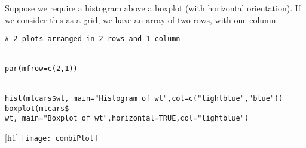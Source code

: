 Suppose we require a histogram above a boxplot (with horizontal orientation). If we consider this as a grid, we have an array of two rows, with one column.

\begin{framed}
\begin{verbatim}
# 2 plots arranged in 2 rows and 1 column


par(mfrow=c(2,1))


hist(mtcars$wt, main="Histogram of wt",col=c("lightblue","blue"))
boxplot(mtcars$
wt, main="Boxplot of wt",horizontal=TRUE,col="lightblue")

\end{verbatim}
\end{framed}

\begin{center}[h1]
\texttt{[image: combiPlot]}
\end{center}
